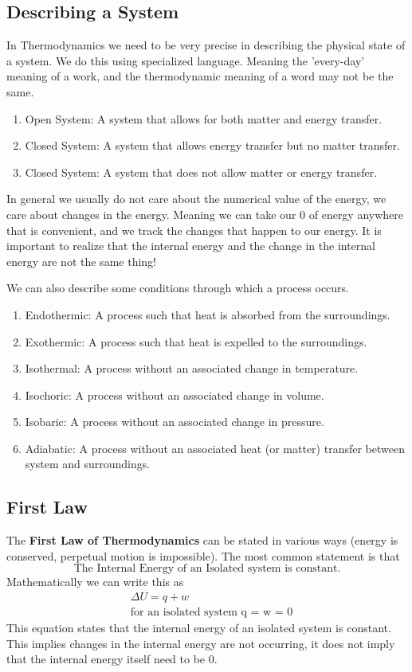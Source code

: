 \documentclass{article}
\newcommand{\be}{\begin{equation}}
\newcommand{\ee}{\end{equation}}
\newcommand{\benum}{\begin{enumerate}}
\newcommand{\eenum}{\end{enumerate}}
\begin{document}
\subsection*{Describing a System}
In Thermodynamics we need to be very precise in describing the physical state of a system. 
We do this using specialized language. 
Meaning the 'every-day' meaning of a work, and the thermodynamic meaning of a word may not be the same. 

\benum
\item Open System: A system that allows for both matter and energy transfer.
\item Closed System: A system that allows energy transfer but no matter transfer. 
\item Closed System: A system that does not allow matter or energy transfer. 
\eenum
In general we usually do not care about the numerical value of the energy, we care about changes in the energy. 
Meaning we can take our 0 of energy anywhere that is convenient, and we track the changes that happen to our energy. 
It is important to realize that the internal energy and the change in the internal energy are not the same thing!

We can also describe some conditions through which a process occurs.
\benum
\item Endothermic: A process such that heat is absorbed from the surroundings.
\item Exothermic: A process such that heat is expelled to the surroundings. 
\item Isothermal: A process without an associated change in temperature.
\item Isochoric: A process without an associated change in volume. 
\item Isobaric: A process without an associated change in pressure.
\item Adiabatic: A process without an associated heat (or matter) transfer between system and surroundings.
\eenum

\subsection*{First Law}
The \textbf{First Law of Thermodynamics} can be stated in various ways (energy is conserved, perpetual motion is impossible). 
The most common statement is that 
\be
\text{The Internal Energy of an Isolated system is constant.}
\ee
Mathematically we can write this as 
\be
\begin{split}
&\Delta U = q + w \\
&\text{for an isolated system q = w = 0}
\end{split}
\ee
This equation states that the internal energy of an isolated system is constant.
This implies changes in the internal energy are not occurring, it does not imply that the internal energy itself need to be 0. 
\end{document}
